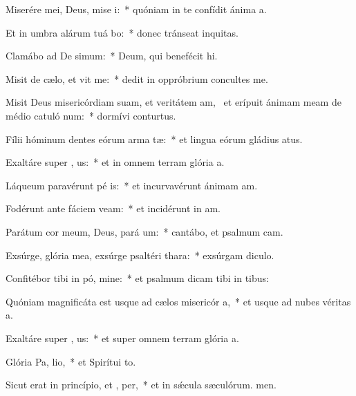\item Miserére mei, Deus, mise i:~* quóniam in te confídit ánima a.
\item Et in umbra alárum tuá bo:~* donec tránseat inquitas.
\item Clamábo ad De simum:~* Deum, qui benefécit hi.
\item Misit de cælo, et vit me:~* dedit in oppróbrium concultes me.
\item Misit Deus misericórdiam suam, et veritátem am,~\pscross{} et erípuit ánimam meam de médio catuló num:~* dormívi conturtus.
\item Fílii hóminum dentes eórum arma  tæ:~* et lingua eórum gládius atus.
\item Exaltáre super , us:~* et in omnem terram glória a.
\item Láqueum paravérunt pé is:~* et incurvavérunt ánimam am.
\item Fodérunt ante fáciem  veam:~* et incidérunt in am.
\item Parátum cor meum, Deus, pará  um:~* cantábo, et psalmum cam.
\item Exsúrge, glória mea, exsúrge psaltéri  thara:~* exsúrgam diculo.
\item Confitébor tibi in pó, mine:~* et psalmum dicam tibi in tibus:
\item Quóniam magnificáta est usque ad cælos misericór a,~* et usque ad nubes véritas a.
\item Exaltáre super , us:~* et super omnem terram glória a.
\item Glória Pa,  lio,~* et Spirítui to.
\item Sicut erat in princípio, et ,  per,~* et in sǽcula sæculórum. men.
